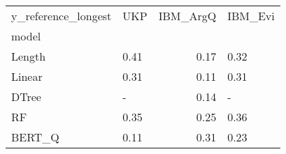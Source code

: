 \begin{tabular}{llrl}
\toprule
y\_reference\_longest &   UKP &  IBM\_ArgQ & IBM\_Evi \\
model  &       &           &         \\
\midrule
Length &  0.41 &      0.17 &    0.32 \\
Linear &  0.31 &      0.11 &    0.31 \\
DTree  &     - &      0.14 &       - \\
RF     &  0.35 &      0.25 &    0.36 \\
BERT\_Q &  0.11 &      0.31 &    0.23 \\
\bottomrule
\end{tabular}
